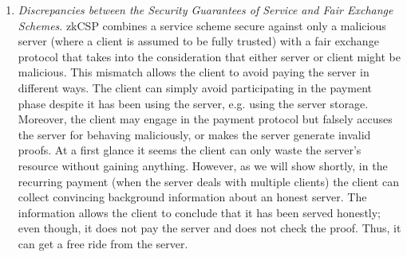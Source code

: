 \begin{enumerate}


\item\textit{Discrepancies between the Security Guarantees of Service and Fair Exchange Schemes}. zkCSP combines a service scheme secure against only a malicious server (where a client is assumed to be fully trusted) with a fair exchange protocol that takes into the consideration that either server or client might be malicious.  This mismatch allows the client to avoid paying the server in different ways. The client can simply avoid participating in the payment phase despite it has been using the server, e.g. using the server storage. Moreover, the client  may engage in the payment protocol but  falsely accuses the server for behaving maliciously, or  makes the server generate invalid proofs.  At a first glance it seems the client can only  waste the server's resource without gaining anything. However, as we will show shortly, in the recurring payment (when the server deals with multiple clients) the client  can collect  convincing background information about an honest server. The information   allows the client to conclude that it has been  served honestly; even though, it does not pay the server and does not check the proof. Thus, it can  get a free ride from the server. 















\end{enumerate}
